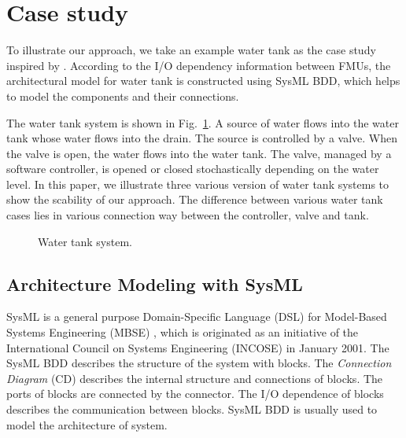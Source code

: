 
\section{Case study}
\label{sec:sysml}
To illustrate our approach, we take an example water tank as the case study inspired by \cite{AmalioPCW16}. According to the I/O dependency information between FMUs, the architectural model for water tank is constructed using SysML BDD, which helps to model the components and their connections.

The water tank system is shown in Fig.~\ref{tankfig}. A source of water flows into the water tank whose water flows into the drain. The source is controlled by a valve. When the valve is open, the water flows into the water tank. The valve, managed by a software controller, is opened or closed stochastically depending on the water level. In this paper, we illustrate three various version of water tank systems to show the scability of our approach. The difference between various water tank cases lies in various connection way between the controller, valve and tank. 
\begin{figure}[htbp]
	\caption{Water tank system.}
	\label{tankfig}
\end{figure} 
\subsection{Architecture Modeling with SysML}
SysML is a general purpose Domain-Specific Language (DSL) \cite{SemerathBHSV17} for Model-Based Systems Engineering (MBSE) \cite{Dori16}, which is originated as an initiative of the International Council on Systems Engineering (INCOSE) \cite{Pepper2015International} in January 2001. The SysML BDD describes the structure of the system with blocks. The \textit{Connection Diagram} (CD) describes the internal structure and connections of blocks. The ports of blocks are connected by the connector. The I/O dependence of blocks describes the communication between blocks. SysML BDD is usually used to model the architecture of system.

